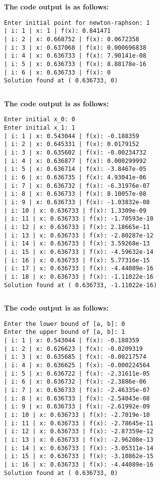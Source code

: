 \documentclass[a4paper]{article}
\begin{document}
\begin{answer}{}
	\inputminted[linenos]{cpp}{/home/solomazer/devel/solvers/newton.cpp}
\end{answer}

\textbf{The code output is as follows:}
\begin{verbatim}
Enter initial point for newton-raphson: 1
| i: 1 | x: 1 | f(x): 0.841471
| i: 2 | x: 0.668752 | f(x): 0.0672358
| i: 3 | x: 0.637068 | f(x): 0.000696838
| i: 4 | x: 0.636733 | f(x): 7.90141e-08
| i: 5 | x: 0.636733 | f(x): 8.88178e-16
| i: 6 | x: 0.636733 | f(x): 0
Solution found at ( 0.636733, 0)
\end{verbatim}

\begin{answer}{}
	\inputminted[linenos]{cpp}{/home/solomazer/devel/solvers/secant.cpp}
\end{answer}
\textbf{The code output is as follows:}
\begin{verbatim}
Enter initial x_0: 0 
Enter initial x_1: 1
| i: 1 | x: 0.543044 | f(x): -0.188359
| i: 2 | x: 0.645331 | f(x): 0.0179152
| i: 3 | x: 0.635602 | f(x): -0.00234732
| i: 4 | x: 0.636877 | f(x): 0.000299992
| i: 5 | x: 0.636714 | f(x): -3.8467e-05
| i: 6 | x: 0.636735 | f(x): 4.93041e-06
| i: 7 | x: 0.636732 | f(x): -6.31976e-07
| i: 8 | x: 0.636733 | f(x): 8.10057e-08
| i: 9 | x: 0.636733 | f(x): -1.03832e-08
| i: 10 | x: 0.636733 | f(x): 1.3309e-09
| i: 11 | x: 0.636733 | f(x): -1.70593e-10
| i: 12 | x: 0.636733 | f(x): 2.18665e-11
| i: 13 | x: 0.636733 | f(x): -2.80287e-12
| i: 14 | x: 0.636733 | f(x): 3.59268e-13
| i: 15 | x: 0.636733 | f(x): -4.59632e-14
| i: 16 | x: 0.636733 | f(x): 5.77316e-15
| i: 17 | x: 0.636733 | f(x): -4.44089e-16
| i: 18 | x: 0.636733 | f(x): -1.11022e-16
Solution found at ( 0.636733, -1.11022e-16)
\end{verbatim}

\begin{answer}{}
	\inputminted[linenos]{cpp}{/home/solomazer/devel/solvers/regula-falsi.cpp}
\end{answer}
\textbf{The code output is as follows:}
\begin{verbatim}
Enter the lower bound of [a, b]: 0
Enter the upper bound of [a, b]: 1
| i: 1 | x: 0.543044 | f(x): -0.188359
| i: 2 | x: 0.626623 | f(x): -0.0209319
| i: 3 | x: 0.635685 | f(x): -0.00217574
| i: 4 | x: 0.636625 | f(x): -0.000224564
| i: 5 | x: 0.636722 | f(x): -2.31611e-05
| i: 6 | x: 0.636732 | f(x): -2.3886e-06
| i: 7 | x: 0.636733 | f(x): -2.46335e-07
| i: 8 | x: 0.636733 | f(x): -2.54043e-08
| i: 9 | x: 0.636733 | f(x): -2.61992e-09
| i: 10 | x: 0.636733 | f(x): -2.7019e-10
| i: 11 | x: 0.636733 | f(x): -2.78645e-11
| i: 12 | x: 0.636733 | f(x): -2.87359e-12
| i: 13 | x: 0.636733 | f(x): -2.96208e-13
| i: 14 | x: 0.636733 | f(x): -3.05311e-14
| i: 15 | x: 0.636733 | f(x): -3.10862e-15
| i: 16 | x: 0.636733 | f(x): -4.44089e-16
Solution found at ( 0.636733, 0)
\end{verbatim}
\end{document}
